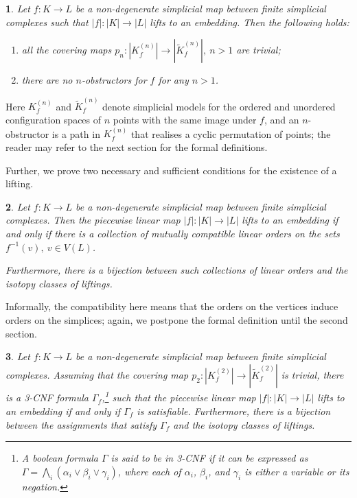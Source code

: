 \documentclass[a4paper,12pt,reqno,oneside]{amsart}
\makeatletter
\theoremstyle{plain}
\theoremstyle{definition}
\theoremstyle{plain}
\newtheorem*{re@theorem}{\re@title}
\newenvironment{retheorem}[1]{%
 \def\re@title{\cref{#1}}%
 \begin{re@theorem}}%
 {\end{re@theorem}}
\newcommand{\from}{\colon}
\newcommand{\wt}[1]{\widetilde{#1}}
\makeatother
\begin{document}
\begin{retheorem}{thm:obstructors}
  Let $f \from K \to L$ be a non-degenerate simplicial map between finite simplicial complexes such
  that $|f| \from |K| \to |L|$ lifts to an embedding. Then the following holds:
  \begin{enumerate}
  \item all the covering maps $p_n \from |K^{(n)}_f| \to |\wt{K}^{(n)}_f|,\ n > 1$ are trivial;
  \item there are no $n$-obstructors for $f$ for any $n > 1$.
  \end{enumerate}
\end{retheorem}

Here $K^{(n)}_f$ and $\wt{K}^{(n)}_f$ denote simplicial models for the ordered and unordered
configuration spaces of $n$ points with the same image under $f$, and an $n$-obstructor is a path in
$K^{(n)}_f$ that realises a cyclic permutation of points; the reader may refer to the next section
for the formal definitions.

Further, we prove two necessary and sufficient conditions for the existence of a lifting.

\begin{retheorem}{thm:orders}
  Let $f \from K \to L$ be a non-degenerate simplicial map between finite simplicial complexes. Then
  the piecewise linear map $|f| \from |K| \to |L|$ lifts to an embedding if and only if there is a
  collection of mutually compatible linear orders on the sets $f^{-1}(v),\ v \in V(L)$.

  Furthermore, there is a bijection between such collections of linear orders and the isotopy classes of liftings.
\end{retheorem}

Informally, the compatibility here means that the orders on the vertices induce orders on the
simplices; again, we postpone the formal definition until the second section.

\begin{retheorem}{thm:gamma_cond}
  Let $f \from K \to L$ be a non-degenerate simplicial map between finite simplicial
  complexes. Assuming that the covering map $p_2 \from |K^{(2)}_f| \to |\wt{K}^{(2)}_f|$ is trivial,
  there is a 3-CNF formula $\Gamma_f$,\footnote{A boolean formula $\Gamma$ is said to be in 3-CNF if
    it can be expressed as $\Gamma = \bigwedge_{i} (\alpha_{i} \vee \beta_{i} \vee \gamma_{i})$,
    where each of $\alpha_{i}$, $\beta_{i}$, and $\gamma_{i}$ is either a variable or its negation.}
  such that the piecewise linear map $|f| \from |K| \to |L|$ lifts to an embedding if and only if
  $\Gamma_f$ is satisfiable. Furthermore, there is a bijection between the assignments that satisfy
  $\Gamma_f$ and the isotopy classes of liftings.
\end{retheorem}
\end{document}
